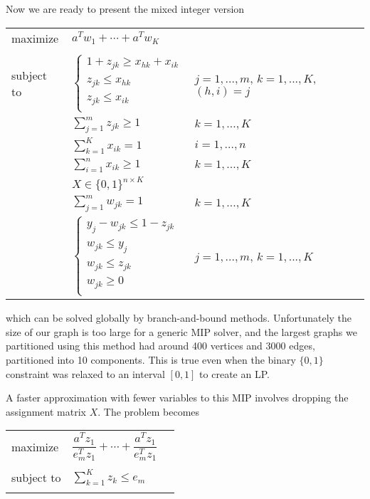 Now we are ready to present the mixed integer version

\bgroup
\def\arraystretch{1.5}
\begin{tabular}{l l l}
maximize   & $a^T w_1 + \cdots + a^T w_K$
\\ \\
subject to 
           & $\begin{cases}
                 1 + z_{jk} \geq x_{hk} + x_{ik} \\
                 z_{jk} \leq x_{hk}             \\
                 z_{jk} \leq x_{ik}             \\
             \end{cases}$
           & $j = 1, ..., m$, $k = 1, ..., K$, $(h,i) = j$ \\
           & $\sum_{j=1}^m z_{jk} \geq 1$ & $k = 1, ..., K$ \\
           & $\sum_{k=1}^K x_{ik} = 1$ & $i = 1, ..., n$ \\
           & $\sum_{i=1}^n x_{ik} \geq 1$ & $k = 1, ..., K$ \\
           & $X \in \{0, 1\}^{n \times K}$ \\
           & $\sum_{j=1}^m w_{jk} = 1$ & $k = 1, ..., K$ \\
           & $\begin{cases}
                y_j - w_{jk} \leq 1 - z_{jk} \\
                w_{jk} \leq y_j \\
                w_{jk} \leq z_{jk} \\
                w_{jk} \geq 0 \\
             \end{cases}$
           & $j = 1, ..., m$, $k = 1, ..., K$
\end{tabular}
\egroup

which can be solved globally by branch-and-bound methods.
Unfortunately the size of our graph is too large for a generic MIP
solver, and the largest graphs we partitioned using this method had
around 400 vertices and 3000 edges, partitioned into 10 components.
This is true even when the binary $\{0, 1\}$ constraint was relaxed
to an interval $[0, 1]$ to create an LP.

A faster approximation with fewer variables to this MIP involves
dropping the assignment matrix $X$. The problem becomes

\bgroup
\def\arraystretch{1.5}
\begin{tabular}{l l l}
maximize   & $\dfrac{a^T z_1}{e_m^T z_1} + \cdots + \dfrac{a^T z_1}{e_m^T z_1}$
\\ \\
subject to & $\sum_{k=1}^K z_k \leq e_m$ \\
           & 
\end{tabular}
\egroup

